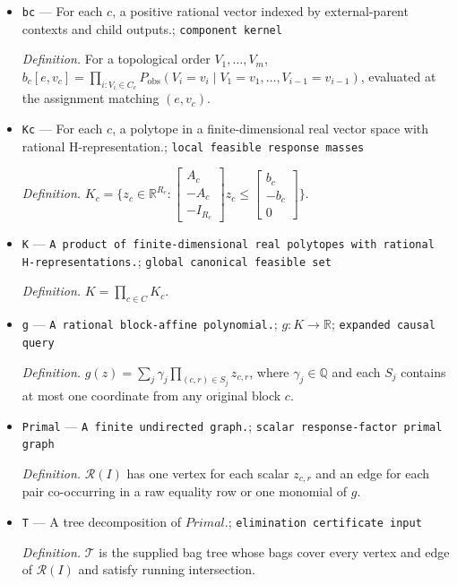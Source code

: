 \documentclass{article}
\begin{document}
\begin{itemize}
  \item \texttt{bc} --- For each \(c\), a positive rational vector indexed by external-parent contexts and child outputs.; \texttt{component kernel}
  \par\smallskip\noindent\emph{Definition.} For a topological order \(V_1,\ldots,V_m\), \(b_c[e,v_c]=\prod_{i:V_i\in C_c}P_{\mathrm{obs}}(V_i=v_i\mid V_1=v_1,\ldots,V_{i-1}=v_{i-1})\), evaluated at the assignment matching \((e,v_c)\).
  \item \texttt{Kc} --- For each \(c\), a polytope in a finite-dimensional real vector space with rational H-representation.; \texttt{local feasible response masses}
  \par\smallskip\noindent\emph{Definition.} \(K_c=\{z_c\in\mathbb R^{R_c}:\begin{bmatrix}A_c\\-A_c\\-I_{R_c}\end{bmatrix}z_c\le\begin{bmatrix}b_c\\-b_c\\0\end{bmatrix}\}\).
  \item \texttt{K} --- \texttt{A product of finite-\allowbreak{}dimensional real polytopes with rational H-\allowbreak{}representations.}; \texttt{global canonical feasible set}
  \par\smallskip\noindent\emph{Definition.} \(K=\prod_{c\in C}K_c\).
  \item \texttt{g} --- \texttt{A rational block-\allowbreak{}affine polynomial.}; \(g:K\to\mathbb R\); \texttt{expanded causal query}
  \par\smallskip\noindent\emph{Definition.} \(g(z)=\sum_j\gamma_j\prod_{(c,r)\in S_j}z_{c,r}\), where \(\gamma_j\in\mathbb Q\) and each \(S_j\) contains at most one coordinate from any original block \(c\).
  \item \texttt{Primal} --- \texttt{A finite undirected graph.}; \texttt{scalar response-\allowbreak{}factor primal graph}
  \par\smallskip\noindent\emph{Definition.} \(\mathcal R(I)\) has one vertex for each scalar \(z_{c,r}\) and an edge for each pair co-occurring in a raw equality row or one monomial of \(g\).
  \item \texttt{T} --- A tree decomposition of \(Primal\).; \texttt{elimination certificate input}
  \par\smallskip\noindent\emph{Definition.} \(\mathcal T\) is the supplied bag tree whose bags cover every vertex and edge of \(\mathcal R(I)\) and satisfy running intersection.

\end{itemize}
\end{document}
